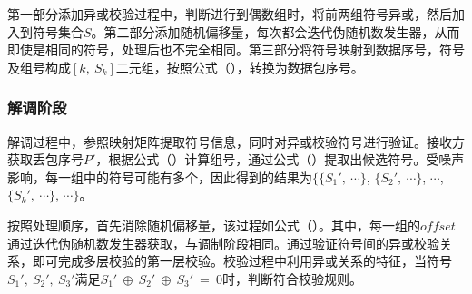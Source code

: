 第一部分添加异或校验过程中，判断进行到偶数组时，将前两组符号异或，然后加入到符号集合$S$。第二部分添加随机偏移量，每次都会迭代伪随机数发生器，从而即使是相同的符号，处理后也不完全相同。第三部分将符号映射到数据序号，符号及组号构成$[k,\ S_{k}]$二元组，按照公式（），转换为数据包序号。

\subsubsection{解调阶段}
\label{chap:hash:robustness:xor:demodulation}


解调过程中，参照映射矩阵提取符号信息，同时对异或校验符号进行验证。接收方获取丢包序号$P'$，根据公式（）计算组号，通过公式（）提取出候选符号。受噪声影响，每一组中的符号可能有多个，因此得到的结果为$\{\{S_1',\ \cdots\}$, $\{S_2',\ \cdots\}$, $\cdots$, $\{S_k',\ \cdots\}$, $\cdots\}$。

按照处理顺序，首先消除随机偏移量，该过程如公式（）。其中，每一组的$offset$通过迭代伪随机数发生器获取，与调制阶段相同。通过验证符号间的异或校验关系，即可完成多层校验的第一层校验。校验过程中利用异或关系的特征，当符号$S_1',\ S_2',\ S_3'$满足$S_1'\ \oplus\ S_2'\ \oplus\ S_3'\ =\ 0$时，判断符合校验规则。
